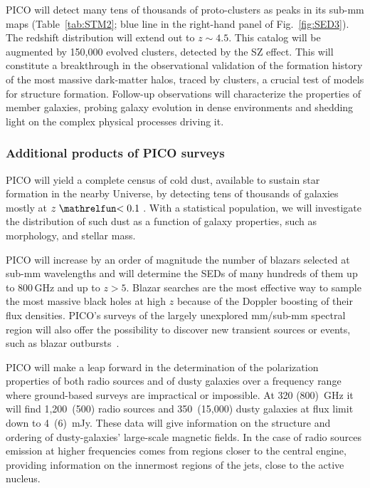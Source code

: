\documentclass[PICOReport.tex]{subfiles}
\begin{document}
PICO will detect many tens of thousands of proto-clusters as peaks in its sub-mm maps (Table~\ref{tab:STM2}; blue line in the right-hand panel of Fig.~\ref{fig:SED3}). The redshift distribution will extend out to $z\sim4.5$. This catalog will be augmented by 150,000 evolved clusters, detected by the SZ effect. This will constitute a breakthrough in the observational validation of the formation history of the most massive dark-matter halos, traced by clusters, a crucial test of models for structure formation. Follow-up observations will characterize the properties of member galaxies, probing galaxy evolution in dense environments and shedding light on the complex physical processes driving it.

\subsubsection{Additional products of PICO surveys}

PICO will yield a complete census of cold dust, available to sustain star formation in the nearby Universe, by detecting tens of thousands of galaxies mostly at $z\simlt 0.1$ . With a statistical population, we will investigate the distribution of such dust as a function of galaxy properties, such as morphology, and stellar mass. 

PICO will increase by an order of magnitude the number of blazars selected at sub-mm wavelengths and will determine the SEDs of many hundreds of them up to 800\,GHz and up to $z> 5$. Blazar searches are the most effective way to sample the most massive black holes at high $z$ because of the Doppler boosting of their flux densities. PICO's surveys of the largely unexplored mm/sub-mm spectral region will also offer the possibility to discover new transient sources or events, such as blazar outbursts~\cite{Metzger2015}.

PICO will make a leap forward in the determination of the polarization properties of both radio sources and of dusty galaxies over a frequency range where ground-based surveys are impractical or impossible. At 320 (800)~GHz it will find 1,200~(500) radio sources and 350~(15,000) dusty galaxies at flux limit down to 4~(6)~mJy.  These data will give information on the structure and ordering of dusty-galaxies' large-scale magnetic fields. In the case of radio sources emission at higher frequencies comes from regions closer to the central engine, providing information on the innermost regions of the jets, close to the active nucleus. 
\end{document}
